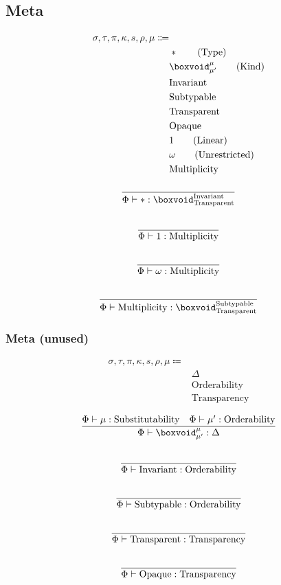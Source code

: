 \documentclass {article}
\begin{document}
\subsection{Meta}
\begin{align*}
\sigma, \tau, \pi, \kappa, s, \rho, \mu \Coloneqq & \\
& * \tag{Type} \\
& \boxvoid^\mu_{\mu'} \tag{Kind} \\
& \text{Invariant} \\
& \text{Subtypable} \\
& \text{Transparent} \\
& \text{Opaque} \\
& 1 \tag{Linear} \\
& \omega \tag{Unrestricted} \\
& \text{Multiplicity} 
\end{align*}

\begin{gather*}
\frac
{}
{\Phi \vdash * : \boxvoid^\text{Invariant}_{\text{Transparent}}} \\
\\
\frac
{}
{\Phi \vdash 1 : \text{Multiplicity}} \\
\\
\frac
{}
{\Phi \vdash \omega : \text{Multiplicity}} \\
\\
\frac
{}
{\Phi \vdash \text{Multiplicity} : \boxvoid^\text{Subtypable}_\text{Transparent}}
\end{gather*}

\subsubsection{Meta (unused)}
\begin{align*}
\sigma, \tau, \pi, \kappa, s, \rho, \mu \Coloneqq & \\
& \Delta \tag{Sort} \\
& \text{Orderability} \\
& \text{Transparency}
\end{align*}

\begin{gather*}
\frac
{\Phi \vdash \mu : \text{Substitutability} \quad \Phi \vdash \mu' : \text{Orderability} }
{\Phi \vdash \boxvoid^\mu_{\mu'} : \Delta} \\
\\
\frac
{}
{\Phi \vdash \text{Invariant} : \text{Orderability}} \\
\\
\frac
{}
{\Phi \vdash \text{Subtypable} : \text{Orderability}} \\
\\
\frac
{}
{\Phi \vdash \text{Transparent} : \text{Transparency}} \\
\\
\frac
{}
{\Phi \vdash \text{Opaque} : \text{Transparency}}
\end{gather*}
    
\end{document}
